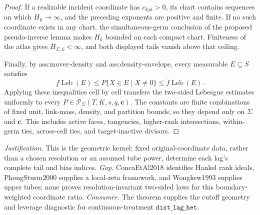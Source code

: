 \documentclass{article}
\begin{document}
\begin{proof}
If a realizable incident coordinate has \(c_{kja}>0\), its chart contains sequences on which \(H_k\to\infty\), and the preceding exponents are positive and finite. If no such coordinate exists in any chart, the simultaneous-germ conclusion of the proposed pseudo-inverse lemma makes \(H_k\) bounded on each compact chart. Finiteness of the atlas gives \(\overline H_{\Sigma,k}<\infty\), and both displayed tails vanish above that ceiling.

Finally, by \(\text{ass:mover-density}\) and \(\text{ass:density-envelope}\), every measurable \(E\subseteq S\) satisfies
\[
\underline f\operatorname{Leb}(E)
\le P\{X\in E\mid X\ne0\}
\le\overline f\operatorname{Leb}(E).
\]
Applying these inequalities cell by cell transfers the two-sided Lebesgue estimates uniformly to every \(P\in\mathcal P_\Sigma(T,K,s,q,\mathbf c)\). The constants are finite combinations of fixed unit, link-mass, density, and partition bounds, so they depend only on \(\Sigma\) and \(\mathbf c\). This includes active faces, tangencies, higher-rank intersections, within-germ ties, across-cell ties, and target-inactive divisors.
\end{proof}
\par\smallskip\noindent \textit{Justification.} This is the geometric kernel: fixed original-coordinate data, rather than a chosen resolution or an assumed tube power, determine each lag's complete tail and bias indices. \textit{Gap.} ConcaEtAl2018 identifies Hankel rank ideals, PhongSturm2000 supplies a local-zeta framework, and Wongkew1993 supplies upper tubes; none proves resolution-invariant two-sided laws for this boundary-weighted coordinate ratio. \textit{Consumer.} The theorem supplies the cutoff geometry and leverage diagnostic for continuous-treatment \(\texttt{dist\_lag\_het}\).
\end{document}
